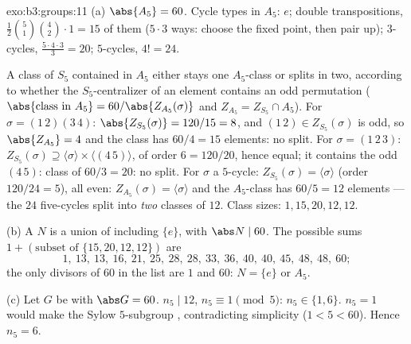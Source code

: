 \begin{solution}{exo:b3:groups:11}
(a) $\abs{A_5} = 60$. Cycle types in $A_5$: $e$; double
transpositions, $\frac{1}{2}\binom{5}{1}\binom{4}{2}\cdot 1 = 15$
of them ($5 \cdot 3$ ways: choose the fixed point, then pair up);
$3$-cycles, $\frac{5 \cdot 4 \cdot 3}{3} = 20$; $5$-cycles, $4! =
24$.

A class of $S_5$ contained in $A_5$ either stays one $A_5$-class
or splits in two, according to whether the $S_5$-centralizer of an
element contains an odd permutation ($\abs{\text{class in }A_5} =
60/\abs{Z_{A_5}(\sigma)}$ and $Z_{A_5} = Z_{S_5} \cap A_5$).
For $\sigma = (1\,2)(3\,4)$: $\abs{Z_{S_5}(\sigma)} = 120/15 = 8$,
and $(1\,2) \in Z_{S_5}(\sigma)$ is odd, so $\abs{Z_{A_5}} = 4$
and the class has $60/4 = 15$ elements: no split. For $\sigma =
(1\,2\,3)$: $Z_{S_5}(\sigma) \supseteq \langle \sigma \rangle
\times \langle (4\,5)\rangle$, of order $6 = 120/20$, hence equal;
it contains the odd $(4\,5)$: class of $60/3 = 20$: no split. For
$\sigma$ a $5$-cycle: $Z_{S_5}(\sigma) = \langle \sigma\rangle$
(order $120/24 = 5$), all even: $Z_{A_5}(\sigma) = \langle
\sigma\rangle$ and the $A_5$-class has $60/5 = 12$ elements --- the
$24$ five-cycles split into \emph{two} classes of $12$. Class
sizes: $1, 15, 20, 12, 12$.

(b) A  $N$ is a union of 
including $\{e\}$, with $\abs N \mid 60$. The possible sums $1 +
(\text{subset of } \{15, 20, 12, 12\})$ are
\[
1,\ 13,\ 13,\ 16,\ 21,\ 25,\ 28,\ 28,\ 33,\ 36,\ 40,\ 40,\ 45,\
48,\ 48,\ 60 ;
\]
the only divisors of $60$ in the list are $1$ and $60$: $N =
\{e\}$ or $A_5$.

(c) Let $G$ be  with $\abs G = 60$. $n_5 \mid 12$, $n_5
\equiv 1 \pmod 5$: $n_5 \in \{1, 6\}$. $n_5 = 1$ would make the
Sylow $5$-subgroup , contradicting simplicity ($1 < 5 <
60$). Hence $n_5 = 6$.
\end{solution}

